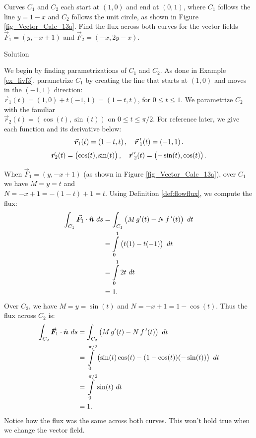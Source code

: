 \begin{example}
\label{ex_flux1}
Curves $C_1$ and $C_2$ each start at $(1,0)$ and end at $(0,1)$, where $C_1$ follows the line $y=1-x$ and $C_2$ follows the unit circle, as shown in Figure \ref{fig_Vector_Calc_13a}. Find the flux across both curves for the vector fields $\vec F_1 = \left( y, -x+1\right)$ and $\vec F_2 = \left( -x, 2y-x\right)$. 





Solution 


We begin by finding parametrizations of $C_1$ and $C_2$. As done in Example \ref{ex_livf3}, parametrize $C_1$ by creating the line that starts at $(1,0)$ and moves in the $\left( -1,1\right)$ direction: \\ $\vec r_1(t) = \left( 1,0\right) + t\left( -1,1\right) = \left( 1-t, t\right)$, for $0\leq t\leq 1$. We parametrize $C_2$ with the familiar \\ $\vec r_2(t) = \left( \cos (t),\sin (t) \right)$ on $0\leq t\leq \pi/2$. For reference later, we give each function and its derivative below:
$$ \vec r_1(t) = \left( 1-t, t\right), \quad \vrp_1(t) = \left( -1,1\right).$$
$$\vec r_2(t) = \left( \cos (t), \sin (t)\right), \quad \vrp_2(t) = \left( -\sin (t) ,\cos (t)\right).$$

When $ \vec F_1 = \left( y, -x+1\right)$ (as shown in Figure \ref{fig_Vector_Calc_13a}), over $C_1$ we have $M = y =t$ and \\ $N = -x+1 = -(1-t)+1 = t$. Using Definition \ref{def:flowflux}, we compute the flux:
\begin{align*}
\int_{C_1} \vec F_1\cdot \hat n\ ds & = \int_{C_1} \left(M\,g'(t) - N\,\fp(t)\right)\ dt\\
			&= \int\limits_0^1 \left( t(1) - t(-1)\right)\ dt \\
			&= \int\limits_0^1 2t\ dt\\
			&= 1.
\end{align*}
Over $C_2$, we have $M = y = \sin (t)$ and $N = -x+1 = 1-\cos (t)$. Thus the flux across $C_2$ is:
\begin{align*}
\int_{C_2} \vec F_1\cdot \hat n\ ds & = \int_{C_2} \left(M\,g'(t) - N\,\fp(t)\right)\ dt\\
				&= \int\limits_0^{\pi/2}\left( \sin (t)\cos (t) - (1-\cos (t))(-\sin (t))\right)\ dt\\
				&= \int\limits_0^{\pi/2} \sin (t)\ dt\\
				&=1.
\end{align*}
Notice how the flux was the same across both curves. This won't hold true when we change the vector field.



\end{example}
